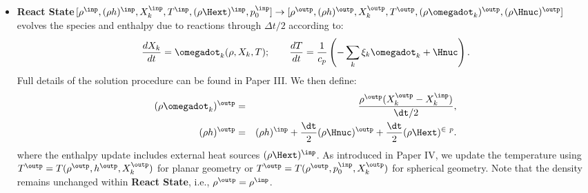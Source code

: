 \begin{itemize}
\item {\bf React State}$[\rho^{\inp},(\rho h)^{\inp},X_k^{\inp},T^{\inp}, (\rho\Hext)^{\inp},                                                      
  p_0^{\inp}] \rightarrow [\rho^{\outp}, (\rho h)^{\outp}, X_k^{\outp},                                   
  T^{\outp}, (\rho \omegadot_k)^{\outp}, (\rho\Hnuc)^{\outp}]$
  evolves the species and enthalpy due to reactions through
  $\Delta t/2$ according to:
\begin{equation}
\frac{dX_k}{dt} = \omegadot_k(\rho,X_k,T) ; \qquad
\frac{dT}{dt}   = \frac{1}{c_p} \left ( -\sum_k \xi_k  \omegadot_k  + \Hnuc \right ).
\end{equation}
Full details of the
solution procedure can be found in Paper III. We then define:
\begin{eqnarray}
(\rho\omegadot_k)^{\outp} &=& \frac{\rho^{\outp} ( X_k^{\outp} - X_k^{\inp})}{\dt/2}, \\
(\rho h)^{\outp} &=& (\rho h)^{\inp} + \frac{\dt}{2} (\rho\Hnuc)^{\outp} + \frac{\dt}{2} (\rho\Hext)^{\in\
p}.
\end{eqnarray}
where the enthalpy update includes external heat sources $(\rho\Hext)^{\inp}$.
As introduced in Paper IV, we update the temperature using $T^{\outp} =                                   
T(\rho^\outp,h^\outp,X_k^\outp)$ for planar geometry or $T^{\outp} =                                      
T(\rho^\outp,p_0^\inp,X_k^\outp)$ for spherical geometry.
Note that the density remains unchanged within {\bf React State}, i.e.,
$\rho^{\outp} = \rho^{\inp}$.



\end{itemize}
